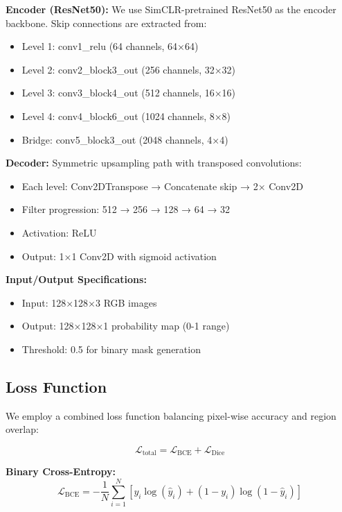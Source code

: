 \documentclass[conference]{IEEEtran}
\begin{document}
\textbf{Encoder (ResNet50):} We use SimCLR-pretrained ResNet50 as the encoder backbone. Skip connections are extracted from:
\begin{itemize}
    \item Level 1: conv1\_relu (64 channels, 64×64)
    \item Level 2: conv2\_block3\_out (256 channels, 32×32)
    \item Level 3: conv3\_block4\_out (512 channels, 16×16)
    \item Level 4: conv4\_block6\_out (1024 channels, 8×8)
    \item Bridge: conv5\_block3\_out (2048 channels, 4×4)
\end{itemize}

\textbf{Decoder:} Symmetric upsampling path with transposed convolutions:
\begin{itemize}
    \item Each level: Conv2DTranspose → Concatenate skip → 2× Conv2D
    \item Filter progression: 512 → 256 → 128 → 64 → 32
    \item Activation: ReLU
    \item Output: 1×1 Conv2D with sigmoid activation
\end{itemize}

\textbf{Input/Output Specifications:}
\begin{itemize}
    \item Input: 128×128×3 RGB images
    \item Output: 128×128×1 probability map (0-1 range)
    \item Threshold: 0.5 for binary mask generation
\end{itemize}

\subsection{Loss Function}
We employ a combined loss function balancing pixel-wise accuracy and region overlap:

\begin{equation}
\mathcal{L}_{\text{total}} = \mathcal{L}_{\text{BCE}} + \mathcal{L}_{\text{Dice}}
\end{equation}

\textbf{Binary Cross-Entropy:}
\begin{equation}
\mathcal{L}_{\text{BCE}} = -\frac{1}{N}\sum_{i=1}^{N} [y_i \log(\hat{y}_i) + (1-y_i)\log(1-\hat{y}_i)]
\end{equation}
\end{document}
